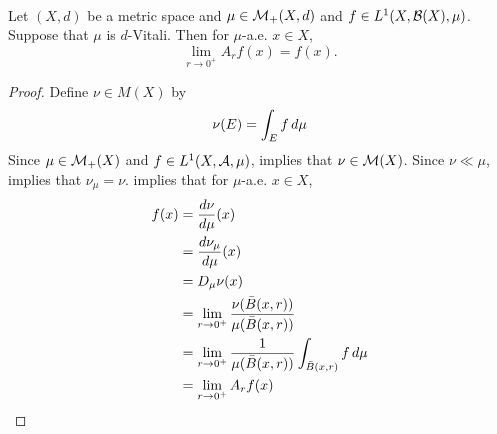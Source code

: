 \documentclass{book}
\begin{document}
	\begin{ex}   \\
		Let $(X, d)$ be a metric space and $\mu \in \mathcal{M}_+(X, d)$ and $f \in L^1(X, \mathcal{B}(X), \mu)$. Suppose that $\mu$ is $d$-Vitali. Then for $\mu$-a.e. $x \in X$,
		$$\lim_{r \rightarrow 0^+} A_r f(x) = f(x).$$
	\end{ex}

	\begin{proof} 
		Define $\nu \in M(X)$ by 
		$$\nu(E) = \int_E f \, d \mu $$ 
		Since $\mu \in \mathcal{M}_+(X)$ and $f \in L^1(X, \mathcal{A}, \mu)$,  implies that $\nu \in \mathcal{M}(X)$. Since $\nu \ll \mu$,  implies that $\nu_{\mu} = \nu$.  implies that for $\mu$-a.e. $x \in X$,
		\begin{align*}
			f(x)
			& = \frac{d \nu}{d \mu}(x) \\
			& = \frac{d \nu_{\mu}}{d \mu}(x) \\
			& = D_{\mu} \nu(x) \\
			& = \lim_{r \rightarrow 0^+} \frac{\nu(\bar{B}(x,r))}{\mu(\bar{B}(x,r))} \\
			& = \lim_{r \rightarrow 0^+} \frac{1}{\mu(\bar{B}(x,r))} \int_{\bar{B}(x,r)} f \, d \mu  \\
			& = \lim_{r \rightarrow 0^+} A_r f(x)
		\end{align*} 
	\end{proof}
	
	
	
	
	
	
	
	
	
	
	
	
	
	
	
	
	
	
	
	
	
	
	
	
	
	
	
	
	
	
	
	
	
	
	
	
	
	
	
	
	
	
	
	
	
\end{document}
